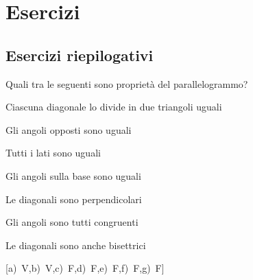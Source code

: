 
\section{Esercizi}

\subsection{Esercizi riepilogativi}

\begin{esercizio}
\label{ese:4.1}
Quali tra le seguenti sono proprietà del parallelogrammo?
\begin{enumeratea}
\item Ciascuna diagonale lo divide in due triangoli 
uguali\hfill\boxV\quad\boxF
\item Gli angoli opposti sono uguali\hfill\boxV\quad\boxF
\item Tutti i lati sono uguali\hfill\boxV\quad\boxF
\item Gli angoli sulla base sono uguali\hfill\boxV\quad\boxF
\item Le diagonali sono perpendicolari\hfill\boxV\quad\boxF
\item Gli angoli sono tutti congruenti\hfill\boxV\quad\boxF
\item Le diagonali sono anche bisettrici\hfill\boxV\quad\boxF
\end{enumeratea}
\hfill[a)~V,\quad b)~V,\quad c)~F,\quad d)~F,\quad e)~F,\quad f)~F,\quad g)~F]
\end{esercizio}

